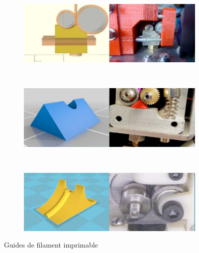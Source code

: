 \documentclass[11pt,a4paper]{article}
\begin{document}
\begin{figure}[H]
    \centering
    \begin{subfigure}[b]{0.5\textwidth}
        \includegraphics[width=\textwidth,cfbox=azul_marcos 4pt 0pt]{FOTOS/GUIA1}
    \end{subfigure}
    ~ %
    \begin{subfigure}[b]{0.5\textwidth}
        \includegraphics[width=\textwidth,cfbox=azul_marcos 4pt 0pt]{FOTOS/GUIA2}
    \end{subfigure}
    ~ %
    \begin{subfigure}[b]{0.5\textwidth}
        \includegraphics[width=\textwidth,cfbox=azul_marcos 4pt 0pt]{FOTOS/GUIA3}
    \end{subfigure}
    \caption*{Guides de filament imprimable}
\end{figure}	
\end{document}
